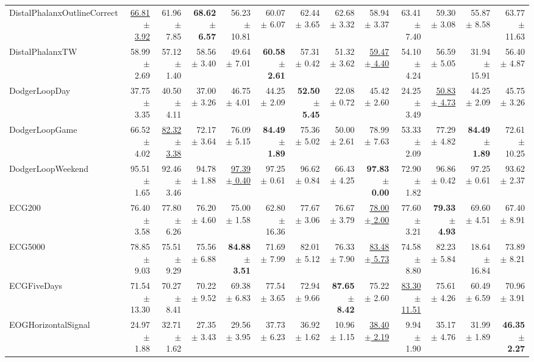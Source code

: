 \begin{landscape}
\begin{longtable}{lrrrrrrrrrrrr}
DistalPhalanxOutlineCorrect & \underline{66.81 $\pm$ 3.92} & 61.96 $\pm$ 7.85 & \textbf{68.62 $\pm$ 6.57} & 56.23 $\pm$ 10.81 & 60.07 $\pm$ 6.07 & 62.44 $\pm$ 3.65 & 62.68 $\pm$ 3.32 & 58.94 $\pm$ 3.37 & 63.41 $\pm$ 7.40 & 59.30 $\pm$ 3.08 & 55.87 $\pm$ 8.58 & 63.77 $\pm$ 11.63 \\
DistalPhalanxTW & 58.99 $\pm$ 2.69 & 57.12 $\pm$ 1.40 & 58.56 $\pm$ 3.40 & 49.64 $\pm$ 7.01 & \textbf{60.58 $\pm$ 2.61} & 57.31 $\pm$ 0.42 & 51.32 $\pm$ 3.62 & \underline{59.47 $\pm$ 4.40} & 54.10 $\pm$ 4.24 & 56.59 $\pm$ 5.05 & 31.94 $\pm$ 15.91 & 56.40 $\pm$ 4.87 \\
DodgerLoopDay & 37.75 $\pm$ 3.35 & 40.50 $\pm$ 4.11 & 37.00 $\pm$ 3.26 & 46.75 $\pm$ 4.01 & 44.25 $\pm$ 2.09 & \textbf{52.50 $\pm$ 5.45} & 22.08 $\pm$ 0.72 & 45.42 $\pm$ 2.60 & 24.25 $\pm$ 3.49 & \underline{50.83 $\pm$ 4.73} & 44.25 $\pm$ 2.09 & 45.75 $\pm$ 3.26 \\
DodgerLoopGame & 66.52 $\pm$ 4.02 & \underline{82.32 $\pm$ 3.38} & 72.17 $\pm$ 3.64 & 76.09 $\pm$ 5.15 & \textbf{84.49 $\pm$ 1.89} & 75.36 $\pm$ 5.02 & 50.00 $\pm$ 2.61 & 78.99 $\pm$ 7.63 & 53.33 $\pm$ 2.09 & 77.29 $\pm$ 4.82 & \textbf{84.49 $\pm$ 1.89} & 72.61 $\pm$ 10.25 \\
DodgerLoopWeekend & 95.51 $\pm$ 1.65 & 92.46 $\pm$ 3.46 & 94.78 $\pm$ 1.88 & \underline{97.39 $\pm$ 0.40} & 97.25 $\pm$ 0.61 & 96.62 $\pm$ 0.84 & 66.43 $\pm$ 4.25 & \textbf{97.83 $\pm$ 0.00} & 72.90 $\pm$ 1.82 & 96.86 $\pm$ 0.42 & 97.25 $\pm$ 0.61 & 93.62 $\pm$ 2.37 \\
ECG200 & 76.40 $\pm$ 3.58 & 77.80 $\pm$ 6.26 & 76.20 $\pm$ 4.60 & 75.00 $\pm$ 1.58 & 62.80 $\pm$ 16.36 & 77.67 $\pm$ 3.06 & 76.67 $\pm$ 3.79 & \underline{78.00 $\pm$ 2.00} & 77.60 $\pm$ 3.21 & \textbf{79.33 $\pm$ 4.93} & 69.60 $\pm$ 4.51 & 67.40 $\pm$ 8.91 \\
ECG5000 & 78.85 $\pm$ 9.03 & 75.51 $\pm$ 9.29 & 75.56 $\pm$ 6.88 & \textbf{84.88 $\pm$ 3.51} & 71.69 $\pm$ 7.99 & 82.01 $\pm$ 5.12 & 76.33 $\pm$ 7.90 & \underline{83.48 $\pm$ 5.73} & 74.58 $\pm$ 8.80 & 82.23 $\pm$ 5.84 & 18.64 $\pm$ 16.84 & 73.89 $\pm$ 8.21 \\
ECGFiveDays & 71.54 $\pm$ 13.30 & 70.27 $\pm$ 8.41 & 70.22 $\pm$ 9.52 & 69.38 $\pm$ 6.83 & 77.54 $\pm$ 3.65 & 72.94 $\pm$ 9.66 & \textbf{87.65 $\pm$ 8.42} & 75.22 $\pm$ 2.60 & \underline{83.30 $\pm$ 11.51} & 75.61 $\pm$ 4.26 & 60.49 $\pm$ 6.59 & 70.96 $\pm$ 3.91 \\
EOGHorizontalSignal & 24.97 $\pm$ 1.88 & 32.71 $\pm$ 1.62 & 27.35 $\pm$ 3.43 & 29.56 $\pm$ 3.95 & 37.73 $\pm$ 6.23 & 36.92 $\pm$ 1.62 & 10.96 $\pm$ 1.15 & \underline{38.40 $\pm$ 2.19} & 9.94 $\pm$ 1.90 & 35.17 $\pm$ 4.76 & 31.99 $\pm$ 1.89 & \textbf{46.35 $\pm$ 2.27} \\

\end{longtable}
\end{landscape}

